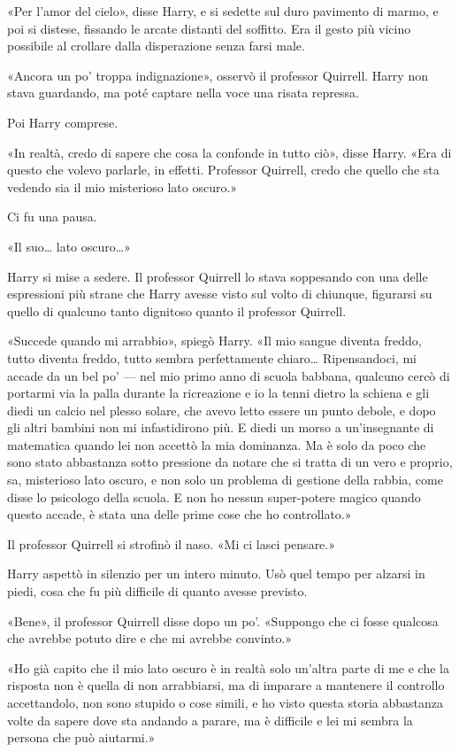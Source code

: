 «Per l’amor del cielo», disse Harry, e si sedette sul duro pavimento di marmo, e poi si distese, fissando le arcate distanti del soffitto. Era il gesto più vicino possibile al crollare dalla disperazione senza farsi male.

«Ancora un po’ troppa indignazione», osservò il professor Quirrell. Harry non stava guardando, ma poté captare nella voce una risata repressa.

Poi Harry comprese.

«In realtà, credo di sapere che cosa la confonde in tutto ciò», disse Harry. «Era di questo che volevo parlarle, in effetti. Professor Quirrell, credo che quello che sta vedendo sia il mio misterioso lato oscuro.»

Ci fu una pausa.

«Il suo… lato oscuro…»

Harry si mise a sedere. Il professor Quirrell lo stava soppesando con una delle espressioni più strane che Harry avesse visto sul volto di chiunque, figurarsi su quello di qualcuno tanto dignitoso quanto il professor Quirrell.

«Succede quando mi arrabbio», spiegò Harry. «Il mio sangue diventa freddo, tutto diventa freddo, tutto sembra perfettamente chiaro… Ripensandoci, mi accade da un bel po’ — nel mio primo anno di scuola babbana, qualcuno cercò di portarmi via la palla durante la ricreazione e io la tenni dietro la schiena e gli diedi un calcio nel plesso solare, che avevo letto essere un punto debole, e dopo gli altri bambini non mi infastidirono più. E diedi un morso a un’insegnante di matematica quando lei non accettò la mia dominanza. Ma è solo da poco che sono stato abbastanza sotto pressione da notare che si tratta di un vero e proprio, sa, misterioso lato oscuro, e non solo un problema di gestione della rabbia, come disse lo psicologo della scuola. E non ho nessun super-potere magico quando questo accade, è stata una delle prime cose che ho controllato.»

Il professor Quirrell si strofinò il naso. «Mi ci lasci pensare.»

Harry aspettò in silenzio per un intero minuto. Usò quel tempo per alzarsi in piedi, cosa che fu più difficile di quanto avesse previsto.

«Bene», il professor Quirrell disse dopo un po’. «Suppongo che ci fosse qualcosa che avrebbe potuto dire e che mi avrebbe convinto.»

«Ho già capito che il mio lato oscuro è in realtà solo un’altra parte di me e che la risposta non è quella di non arrabbiarsi, ma di imparare a mantenere il controllo accettandolo, non sono stupido o cose simili, e ho visto questa storia abbastanza volte da sapere dove sta andando a parare, ma è difficile e lei mi sembra la persona che può aiutarmi.»

